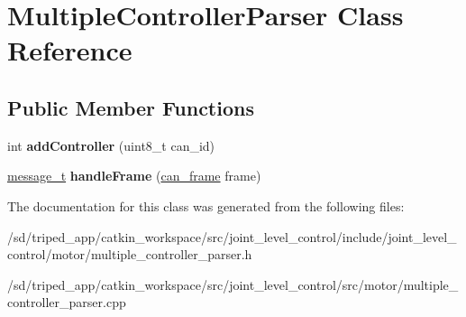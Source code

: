 \hypertarget{classMultipleControllerParser}{}\section{Multiple\+Controller\+Parser Class Reference}
\label{classMultipleControllerParser}
\subsection*{Public Member Functions}
\begin{DoxyCompactItemize}
\item 
\mbox{\label{classMultipleControllerParser_a9f7fc9bcef88ff36f78add7ee5e22fd3}} 
int {\bfseries add\+Controller} (uint8\+\_\+t can\+\_\+id)
\item 
\mbox{\label{classMultipleControllerParser_a8bef539882907a651c6ad1938da9f0e7}} 
\hyperlink{structMessage}{message\+\_\+t} {\bfseries handle\+Frame} (\hyperlink{structcan__frame}{can\+\_\+frame} frame)
\end{DoxyCompactItemize}


The documentation for this class was generated from the following files\+:\begin{DoxyCompactItemize}
\item 
/sd/triped\+\_\+app/catkin\+\_\+workspace/src/joint\+\_\+level\+\_\+control/include/joint\+\_\+level\+\_\+control/motor/multiple\+\_\+controller\+\_\+parser.\+h\item 
/sd/triped\+\_\+app/catkin\+\_\+workspace/src/joint\+\_\+level\+\_\+control/src/motor/multiple\+\_\+controller\+\_\+parser.\+cpp\end{DoxyCompactItemize}

